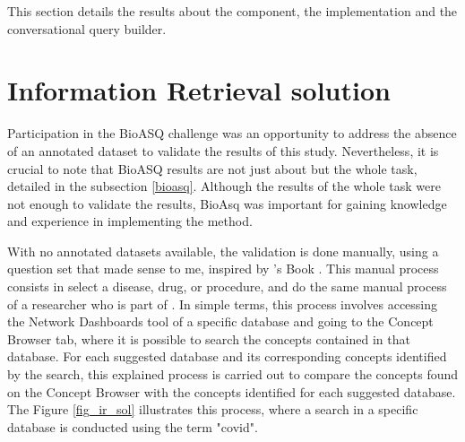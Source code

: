 This section details the results about the {\ir} component, the {\llm} implementation and the conversational query builder.


\section{Information Retrieval solution}



Participation in the BioASQ challenge was an opportunity to address the absence of an annotated dataset to validate the results of this study. Nevertheless, it is crucial to note that BioASQ results are not just about {\ir} but the whole task, detailed in the subsection \ref{bioasq}. Although the results of the whole task were not enough to validate the {\ir} results, BioAsq was important for gaining knowledge and experience in implementing the method.


With no annotated datasets available, the {\bm} validation is done manually, using a question set that made sense to me, inspired by {\ohdsi}'s Book \cite{informatics_book_nodate}. This manual process consists in select a disease, drug, or procedure, and do the same manual process of a researcher who is part of {\ehden}. In simple terms, this process involves accessing the Network Dashboards tool of a specific database and going to the Concept Browser tab, where it is possible to search the concepts contained in that database. For each suggested database and its corresponding concepts identified by the search, this explained process is carried out to compare the concepts found on the Concept Browser with the concepts identified for each suggested database. The Figure \ref{fig_ir_sol} illustrates this process, where a search in a specific database is conducted using the term "covid". 

